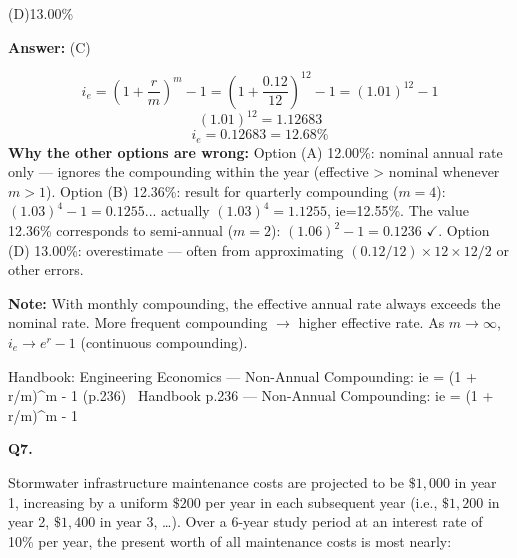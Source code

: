 \documentclass[11pt]{article}
\newcommand{\optline}[2]{\par\noindent\hspace{1.2em}(#1)\hspace{0.6em}#2}
\begin{document}
\optline{D}{13.00\%}
\par\vspace{3pt}
\vspace{2pt}\par\noindent\colorbox{boxbg}{\parbox{\dimexpr\linewidth-2\fboxsep\relax}{%
\vspace{2pt}\textbf{Answer:} (C)\par\vspace{2pt}
{\small \[i_e = \left(1 + \frac{r}{m}\right)^m - 1 = \left(1 + \frac{0.12}{12}\right)^{12} - 1 = (1.01)^{12} - 1\]
\[(1.01)^{12} = 1.12683\]
\[i_e = 0.12683 = 12.68\%\]
\textbf{Why the other options are wrong:} Option (A) 12.00\%: nominal annual rate only --- ignores the compounding within the year (effective \textgreater{} nominal whenever $m > 1$). Option (B) 12.36\%: result for quarterly compounding ($m = 4$): $(1.03)^4 - 1 = 0.1255$... actually $(1.03)^4 = 1.1255$, ie=12.55\%. The value 12.36\% corresponds to semi-annual ($m=2$): $(1.06)^2 - 1 = 0.1236$ $\checkmark$. Option (D) 13.00\%: overestimate --- often from approximating $(0.12/12) \times 12 \times 12 / 2$ or other errors.\par
\textbf{Note:} With monthly compounding, the effective annual rate always exceeds the nominal rate. More frequent compounding $\rightarrow$ higher effective rate. As $m \rightarrow \infty$, $i_e \rightarrow e^r - 1$ (continuous compounding).\par}\par\vspace{2pt}
{\footnotesize\color{soft}Handbook: Engineering Economics --- Non-Annual Compounding: ie = (1 + r/m)\textasciicircum{}m - 1 (p.236) \textbullet\ Handbook p.236 --- Non-Annual Compounding: ie = (1 + r/m)\textasciicircum{}m - 1}\vspace{2pt}
}}
\vspace{9pt}
\filbreak
\textbf{\color{accent}Q7.}\par\vspace{2pt}
Stormwater infrastructure maintenance costs are projected to be $\$1{,}000$ in year 1, increasing by a uniform $\$200$ per year in each subsequent year (i.e., $\$1{,}200$ in year 2, $\$1{,}400$ in year 3, …). Over a 6-year study period at an interest rate of 10\% per year, the present worth of all maintenance costs is most nearly:\par\par\vspace{3pt}
\end{document}
